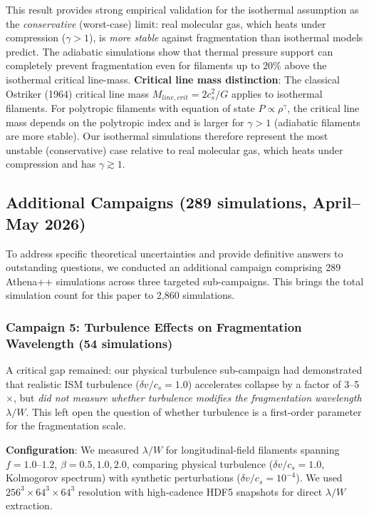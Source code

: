 \documentclass[twocolumn,longtitle,usenatbib]{mnras}
\begin{document}

This result provides strong empirical validation for the isothermal assumption as the {\it conservative} (worst-case) limit: real molecular gas, which heats under compression ($\gamma > 1$), is {\it more stable} against fragmentation than isothermal models predict. The adiabatic simulations show that thermal pressure support can completely prevent fragmentation even for filaments up to $20\%$ above the isothermal critical line-mass. \textbf{Critical line mass distinction}: The classical Ostriker (1964) critical line mass $M_{line,crit} = 2c_s^2/G$ applies to isothermal filaments. For polytropic filaments with equation of state $P \propto \rho^\gamma$, the critical line mass depends on the polytropic index and is larger for $\gamma > 1$ (adiabatic filaments are more stable). Our isothermal simulations therefore represent the most unstable (conservative) case relative to real molecular gas, which heats under compression and has $\gamma \gtrsim 1$.

\subsection{Additional Campaigns (289 simulations, April--May 2026)}
\label{sec:additional_campaigns}

To address specific theoretical uncertainties and provide definitive answers to outstanding questions, we conducted an additional campaign comprising 289 Athena++ simulations across three targeted sub-campaigns. This brings the total simulation count for this paper to 2,860 simulations.

\subsubsection{Campaign 5: Turbulence Effects on Fragmentation Wavelength (54 simulations)}

A critical gap remained: our physical turbulence sub-campaign had demonstrated that realistic ISM turbulence ($\delta v/c_s = 1.0$) accelerates collapse by a factor of 3--5$\times$, but \textit{did not measure whether turbulence modifies the fragmentation wavelength $\lambda/W$}. This left open the question of whether turbulence is a first-order parameter for the fragmentation scale.

\textbf{Configuration}: We measured $\lambda/W$ for longitudinal-field filaments spanning $f = 1.0$--$1.2$, $\beta = 0.5, 1.0, 2.0$, comparing physical turbulence ($\delta v/c_s = 1.0$, Kolmogorov spectrum) with synthetic perturbations ($\delta v/c_s = 10^{-4}$). We used $256^3 \times 64^3 \times 64^3$ resolution with high-cadence HDF5 snapshots for direct $\lambda/W$ extraction.
\end{document}
